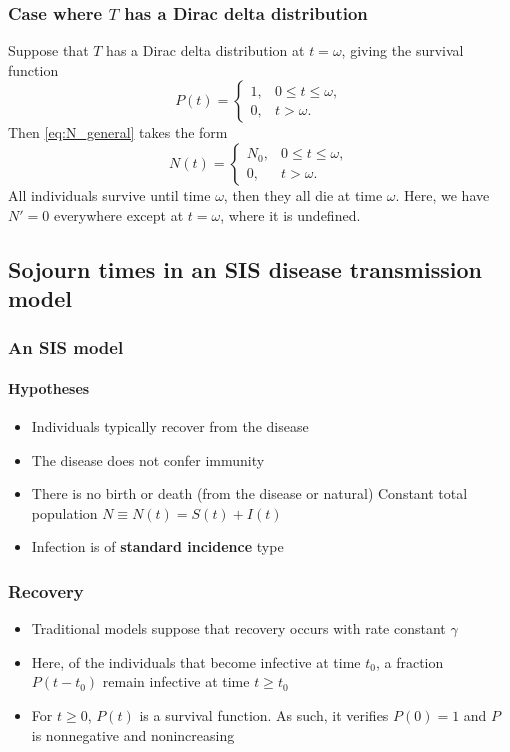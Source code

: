\documentclass[aspectratio=169]{beamer}\usepackage[]{graphicx}\usepackage[]{xcolor}
\begin{document}
\begin{frame}\frametitle{Case where $T$ has a Dirac delta distribution}
Suppose that $T$ has a Dirac delta distribution at $t=\omega$, giving the
survival function 
\[
P(t)=\begin{cases}
1, & 0\leq t\leq\omega,\\
0, & t>\omega.
\end{cases}
\]
Then \eqref{eq:N_general} takes the form
\begin{equation}\label{eq:N2}
N(t)=\begin{cases}
N_0, & 0\leq t\leq\omega,\\
0, & t>\omega.
\end{cases}
\end{equation}
All individuals survive until time $\omega$, then they all die at time $\omega$.
\vfill
Here, we have $N'=0$ everywhere except at $t=\omega$, where it is undefined.
\end{frame}


\subsection{Sojourn times in an SIS disease transmission model} 

\begin{frame}\frametitle{An SIS model}
\framesubtitle{Hypotheses}
\begin{itemize}
\item Individuals typically recover from the disease
\vfill
\item The disease does not confer immunity
\vfill
\item There is no birth or death (from the disease or natural) \newline\imply\;
Constant total population $N\equiv N(t)=S(t)+I(t)$
\vfill
\item Infection is of \textbf{standard incidence} type
\end{itemize}
\end{frame}


\begin{frame}\frametitle{Recovery}
\begin{itemize}
\item Traditional models suppose that recovery occurs with rate constant
$\gamma$
\vfill
\item Here, of the individuals that become
infective at time $t_0$, a fraction $P(t-t_0)$ remain infective at
time $t\geq t_0$
\vfill
\item \imply\;
For $t\geq 0$, $P(t)$ is a survival function. As such, it verifies
$P(0)=1$ and $P$ is nonnegative and nonincreasing
\end{itemize}
\end{frame}
\end{document}
